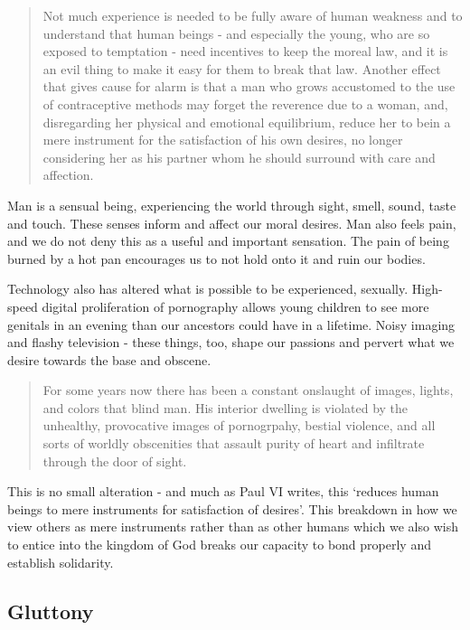\documentclass[letterpaper]{article}
\begin{document}
\begin{quote}
  Not much experience is needed to be fully aware of human weakness and to understand that human beings - and especially the young, who are so exposed to temptation - need incentives to keep the moreal law, and it is an evil thing to make it easy for them to break that law. Another effect that gives cause for alarm is that a man who grows accustomed to the use of contraceptive methods may forget the reverence due to a woman, and, disregarding her physical and emotional equilibrium, reduce her to bein a mere instrument for the satisfaction of his own desires, no longer considering her as his partner whom he should surround with care and affection.
\end{quote}

Man is a sensual being, experiencing the world through sight, smell, sound, taste and touch. These senses inform and affect our moral desires. Man also feels pain, and we do not deny this as a useful and important sensation. The pain of being burned by a hot pan encourages us to not hold onto it and ruin our bodies.

Technology also has altered what is possible to be experienced, sexually. High-speed digital proliferation of pornography allows young children to see more genitals in an evening than our ancestors could have in a lifetime. Noisy imaging and flashy television - these things, too, shape our passions and pervert what we desire towards the base and obscene.

\begin{quote}
  For some years now there has been a constant onslaught of images, lights, and colors that blind man. His interior dwelling is violated by the unhealthy, provocative images of pornogrpahy, bestial violence, and all sorts of worldly obscenities that assault purity of heart and infiltrate through the door of sight.
\end{quote}

This is no small alteration - and much as Paul VI writes, this `reduces human beings to mere instruments for satisfaction of desires'. This breakdown in how we view others as mere instruments rather than as other humans which we also wish to entice into the kingdom of God breaks our capacity to bond properly and establish solidarity.

\subsection{Gluttony}
\end{document}
